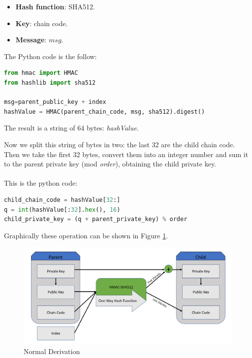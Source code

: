 \begin{itemize}[label=$\odot$]
	\item \textbf{Hash function}: SHA512.
	\item \textbf{Key}: chain code.
	\item \textbf{Message}: $msg$.
\end{itemize}
The Python code is the follow:
\begin{lstlisting}[language=Python]
from hmac import HMAC
from hashlib import sha512

msg=parent_public_key + index
hashValue = HMAC(parent_chain_code, msg, sha512).digest()
\end{lstlisting}
\begin{flushleft}
	The result is a string of 64 bytes: \textit{hashValue}.
\end{flushleft}
Now we split this string of bytes in two: the last 32 are the child chain code. Then we take the first 32 bytes, convert them into an integer number and sum it to the parent private key (mod \textit{order}), obtaining the child private key.\\ \\
This is the python code:

\begin{lstlisting}[language=Python]
child_chain_code = hashValue[32:]
q = int(hashValue[:32].hex(), 16)
child_private_key = (q + parent_private_key) % order
\end{lstlisting}

\begin{flushleft}
	Graphically these operation can be shown in Figure \ref{fig:normal_derivation}.
\end{flushleft}

\begin{figure}[ht!]
	\centering
	\includegraphics[width=14.5cm]{Figures/normal_derivation_v2.png}
	\caption{Normal Derivation }
	\label{fig:normal_derivation}
\end{figure}


